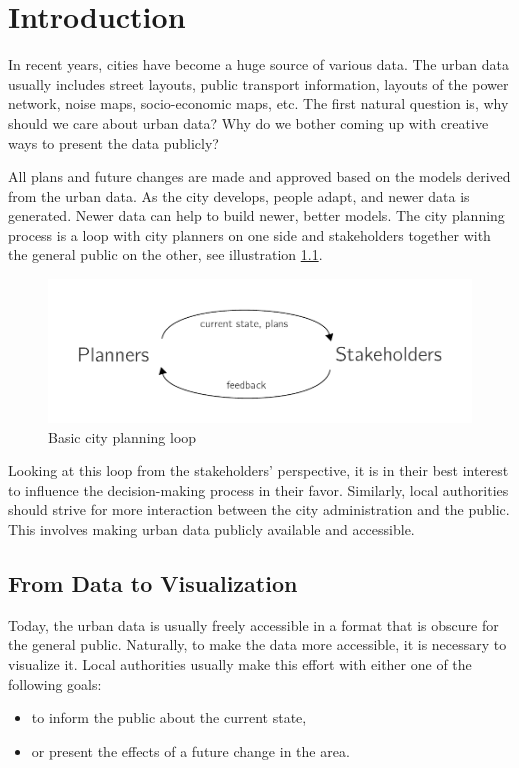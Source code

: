\chapter{Introduction}
In recent years, cities have become a huge source of various data. The urban data usually includes street layouts, public transport information, layouts of the power network, noise maps, socio-economic maps, etc. The first natural question is, why should we care about urban data? Why do we bother coming up with creative ways to present the data publicly?

All plans and future changes are made and approved based on the models derived from the urban data. As the city develops, people adapt, and newer data is generated. Newer data can help to build newer, better models. The city planning process is a loop with city planners on one side and stakeholders together with the general public on the other, see illustration \ref{fig:loop1}.  

\begin{figure}[h]
    \centering
    \includegraphics[width=0.7\linewidth]{figures/Loop1.pdf}
    \caption{Basic city planning loop}
    \label{fig:loop1}
\end{figure}

Looking at this loop from the stakeholders' perspective, it is in their best interest to influence the decision-making process in their favor. Similarly, local authorities should strive for more interaction between the city administration and the public. This involves making urban data publicly available and accessible.

\section{From Data to Visualization}
Today, the urban data is usually freely accessible in a format that is obscure for the general public. Naturally, to make the data more accessible, it is necessary to visualize it. Local authorities usually make this effort with either one of the following goals: 
\begin{itemize}
    \item to inform the public about the current state,
    \item or present the effects of a future change in the area.
\end{itemize}

